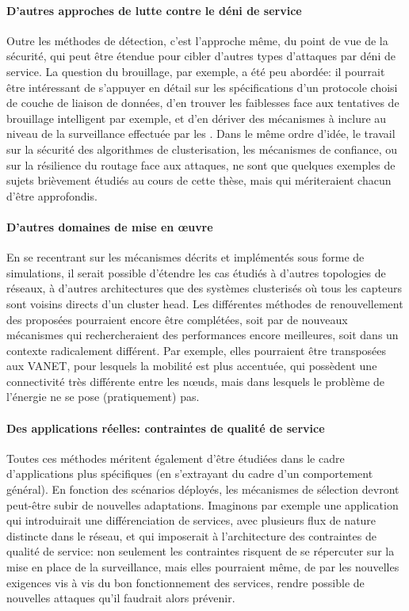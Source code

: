     \paragraph{D'autres approches de lutte contre le déni de service}
Outre les méthodes de détection, c'est l'approche même, du point de vue de la sécurité, qui peut être étendue pour cibler d'autres types d'attaques par déni de service.
La question du brouillage, par exemple, a été peu abordée: il pourrait être intéressant de s'appuyer en détail sur les spécifications d'un protocole choisi de couche de liaison de données, d'en trouver les faiblesses face aux tentatives de brouillage intelligent par exemple, et d'en dériver des mécanismes à inclure au niveau de la surveillance effectuée par les \cnst.
Dans le même ordre d'idée, le travail sur la sécurité des algorithmes de clusterisation, les mécanismes de confiance, ou sur la résilience du routage face aux attaques, ne sont que quelques exemples de sujets brièvement étudiés au cours de cette thèse, mais qui mériteraient chacun d'être approfondis.

    \paragraph{D'autres domaines de mise en œuvre}
En se recentrant sur les mécanismes décrits et implémentés sous forme de simulations, il serait possible d'étendre les cas étudiés à d'autres topologies de réseaux, à d'autres architectures que des systèmes clusterisés où tous les capteurs sont voisins directs d'un cluster head.
Les différentes méthodes de renouvellement des \cnst proposées pourraient encore être complétées, soit par de nouveaux mécanismes qui rechercheraient des performances encore meilleures, soit dans un contexte radicalement différent.
Par exemple, elles pourraient être transposées aux VANET, pour lesquels la mobilité est plus accentuée, qui possèdent une connectivité très différente entre les nœuds, mais dans lesquels le problème de l'énergie ne se pose (pratiquement) pas.

\pagebreak %
    \paragraph{Des applications réelles: contraintes de qualité de service}
Toutes ces méthodes méritent également d'être étudiées dans le cadre d'applications plus spécifiques (en s'extrayant du cadre d'un comportement général).
En fonction des scénarios déployés, les mécanismes de sélection devront peut-être subir de nouvelles adaptations.
Imaginons par exemple une application qui introduirait une différenciation de services, avec plusieurs flux de nature distincte dans le réseau, et qui imposerait à l'architecture des contraintes de qualité de service: non seulement les contraintes risquent de se répercuter sur la mise en place de la surveillance, mais elles pourraient même, de par les nouvelles exigences vis à vis du bon fonctionnement des services, rendre possible de nouvelles attaques qu'il faudrait alors prévenir.

